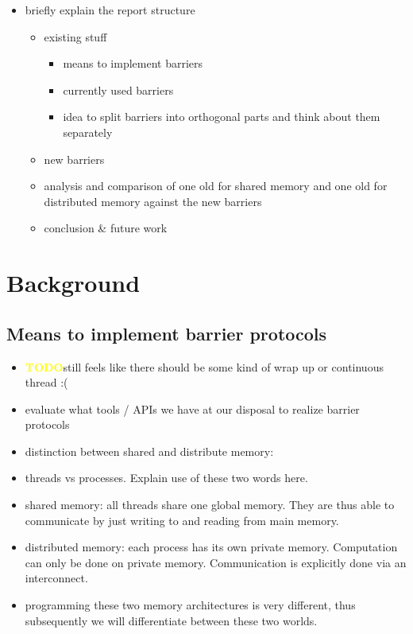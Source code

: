 \documentclass[a4paper, 10pt]{article}
\def \todo{\textbf{\textcolor{yellow}{TODO}}}
\begin{document}
\begin{itemize}
\begin{itemize}
		\end{itemize}
	\item briefly explain the report structure
		\begin{itemize}
			\item existing stuff
				\begin{itemize}
					\item means to implement barriers
					\item currently used barriers
					\item idea to split barriers into orthogonal parts and think about them separately
				\end{itemize}
			\item new barriers
			\item analysis and comparison of one old for shared memory and one old for distributed memory against the new barriers
			\item conclusion \& future work
		\end{itemize}
\end{itemize}

\section{Background}
\label{sec:existing}

\subsection{Means to implement barrier protocols}
\label{ssec:existing-means}
\begin{itemize}
	\item \todo still feels like there should be some kind of wrap up or continuous thread :(
	\item evaluate what tools / APIs we have at our disposal to realize barrier protocols
	\item distinction between shared and distribute memory:
	\item threads vs processes. Explain use of these two words here.
	\item shared memory: all threads share one global memory. They are thus able to communicate by just writing to and reading from main memory.
	\item distributed memory: each process has its own private memory. Computation can only be done on private memory. Communication is explicitly done via an interconnect.
	\item programming these two memory architectures is very different, thus subsequently we will differentiate between these two worlds.
\end{itemize}
\end{document}
